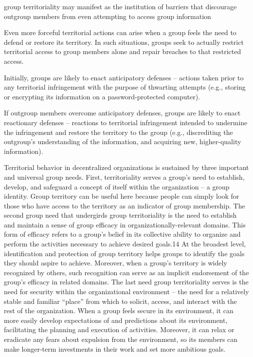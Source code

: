 group territoriality may manifest as the institution of barriers that discourage outgroup members from even attempting to access group information

Even more forceful territorial actions can arise when a group feels the need to defend or restore its territory.  In such situations, groups seek to actually restrict territorial  access to group members alone and repair breaches to that restricted access.

Initially, groups are likely to enact anticipatory defenses – actions taken prior to any territorial infringement with the purpose of thwarting attempts (e.g., storing or encrypting its information on a password-protected computer). 

If outgroup members overcome anticipatory defenses, groups are  likely to enact reactionary defenses – reactions to territorial infringement intended to undermine the infringement and restore the territory to the group (e.g., discrediting the outgroup’s understanding of the information, and acquiring new, higher-quality information).

Territorial behavior in decentralized organizations is sustained by three important and universal group needs.  
    First, territoriality serves a group’s need to establish, develop, and safeguard a  concept of itself within the organization – a group identity.  Group territory can be useful here  because people can simply look for those who have access to the territory as an indicator of group membership.
    The second group need that undergirds group territoriality is the need to establish and maintain a sense of group efficacy in organizationally-relevant domains. This form of efficacy refers to a group’s belief in its collective ability to organize and perform the activities necessary to achieve desired goals.14 At the broadest level, identification and protection of group territory helps groups to identify the goals they should aspire to achieve. Moreover, when a group’s territory is widely recognized by others, such recognition can serve as an implicit endorsement of the group’s efficacy in related domains.
    The last need group territoriality serves is the need for security within the organizational environment – the need for a relatively stable and familiar “place” from which to solicit, access, and interact with the rest of the organization.  When a group feels secure in its environment, it can more easily develop expectations of and predictions about its environment, facilitating the planning and execution of activities. Moreover, it can relax or eradicate any fears about expulsion from the environment, so its members can make longer-term investments in their work and set more ambitious goals.



